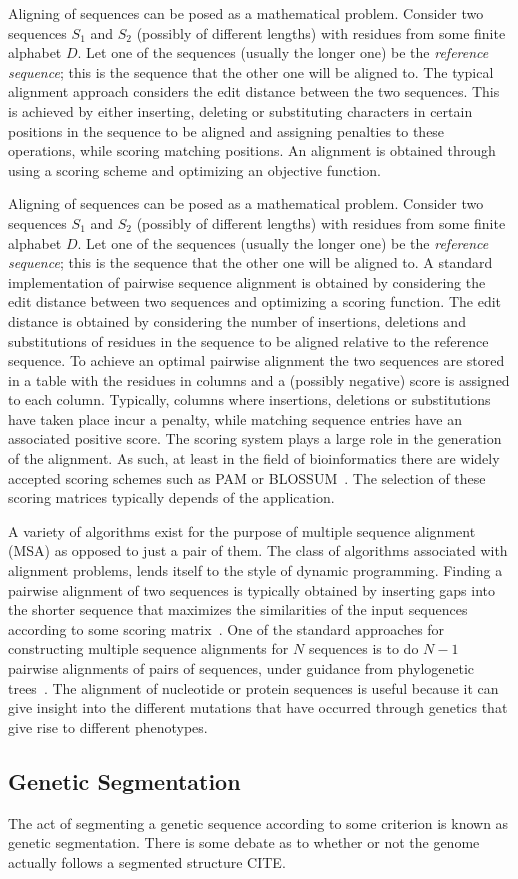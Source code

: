 Aligning of sequences can be posed as a mathematical problem. Consider two sequences $S_1$ and $S_2$ (possibly of different lengths) with residues from some finite alphabet $D$. Let one of the sequences (usually the longer one) be the \textit{reference sequence}; this is the sequence that the other one will be aligned to. The typical alignment approach considers the edit distance between the two sequences. This is achieved by either inserting, deleting or substituting characters in certain positions in the sequence to be aligned and assigning penalties to these operations, while scoring matching positions. An alignment is obtained through using a scoring scheme and optimizing an objective function. 

Aligning of sequences can be posed as a mathematical problem. Consider two sequences $S_1$ and $S_2$ (possibly of different lengths) with residues from some finite alphabet $D$. Let one of the sequences (usually the longer one) be the \textit{reference sequence}; this is the sequence that the other one will be aligned to.
A standard implementation of pairwise sequence alignment is obtained by considering the edit distance between two sequences and optimizing a scoring function. The edit distance is obtained by considering the number of insertions, deletions and substitutions of residues in the sequence to be aligned relative to the reference sequence. To achieve an optimal pairwise alignment the two sequences are stored in a table with the residues in columns and a (possibly negative) score is assigned to each column. Typically, columns where insertions, deletions or substitutions have taken place incur a penalty, while matching sequence entries have an associated positive score. The scoring system plays a large role in the generation of the alignment. As such, at least in the field of bioinformatics there are widely accepted scoring schemes such as PAM or BLOSSUM~\cite{mount2008comparison}. The selection of these scoring matrices typically depends of the application.

A variety of algorithms exist for the purpose of multiple sequence alignment (MSA) as opposed to just a pair of them. The class of algorithms associated with alignment problems, lends itself to the style of dynamic programming. Finding a pairwise alignment of two sequences is typically obtained by inserting gaps into the shorter sequence that maximizes the similarities of the input sequences according to some scoring matrix~\cite{edgar2006multiple}. One of the standard approaches for constructing multiple sequence alignments for $N$ sequences is to do $N-1$ pairwise alignments of pairs of sequences, under guidance from phylogenetic trees~\cite{feng1987progressive}.
	The alignment of nucleotide or protein sequences is useful because it can give insight into the different mutations that have occurred through genetics that give rise to different phenotypes. 
	\subsection{Genetic Segmentation}
	The act of segmenting a genetic sequence according to some criterion is known as genetic segmentation. There is some debate as to whether or not the genome actually follows a segmented structure {\color{red}CITE}. 
